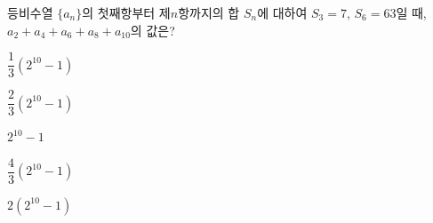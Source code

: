 등비수열 $\{a_n\}$의 첫째항부터 제$n$항까지의 합 $S_n$에 대하여 $S_3=7$, $S_6=63$일 때, $a_2+a_4+a_6+a_8+a_{10}$의 값은?
\begin{choices32}{\rule[-3ex]{0pt}{8ex}$\dfrac{1}{3}(2^{10}-1)$}{\rule[-3ex]{0pt}{8ex}$\dfrac{2}{3}(2^{10}-1)$}{\rule[-3ex]{0pt}{8ex}$2^{10}-1$}{\rule[-3ex]{0pt}{8ex}$\dfrac{4}{3}(2^{10}-1)$}{\rule[-3ex]{0pt}{8ex}$2(2^{10}-1)$}\end{choices32}
